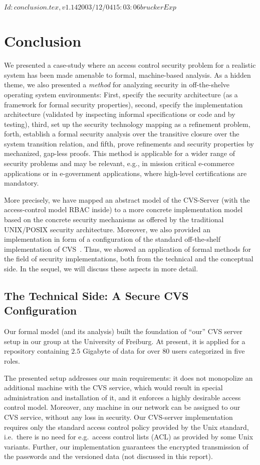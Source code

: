\rcsInfo $Id: conclusion.tex,v 1.14 2003/12/04 15:03:06 brucker Exp $

\chapter{Conclusion}

We presented a case-study where an access control security problem for a
realistic system has been made amenable to formal, machine-based analysis. As a
hidden theme, we also presented a \emph{method} for analyzing security in
off-the-shelve operating system environments: First, specify the security
architecture (as a framework for formal security properties), second, specify
the implementation architecture (validated by inspecting informal specifications
or code and by testing), third, set up the security technology mapping as a
refinement problem, forth, establish a formal security analysis over the
transitive closure over the system transition relation, and fifth, prove
refinements and security properties by mechanized, gap-less proofs. This method
is applicable for a wider range of security problems and may be relevant, e.g.,
in mission critical e-commerce applications or in e-government applications,
where high-level certifications are mandatory.

More precisely, we have mapped an abstract model of the CVS-Server (with the
access-control model RBAC inside) to a more concrete implementation model based
on the concrete security mechanisms as offered by the traditional UNIX/POSIX
security architecture. Moreover, we also provided an implementation in form of a
configuration of the standard off-the-shelf implementation of
CVS~\cite{cvshome:2001}.  Thus, we showed an application of formal methods for
the field of security implementations, both from the technical and the
conceptual side. In the sequel, we will discuss these aspects in more detail.

\section{The Technical Side: A Secure CVS Configuration}
Our formal model (and its analysis) built the foundation of ``our'' CVS server
setup in our group at the University of Freiburg. At present, it is applied for
a repository containing $2.5$ Gigabyte of data for over $80$ users categorized
in five roles.

The presented setup addresses our main requirements: it does not monopolize an
additional machine with the CVS service, which would result in special
administration and installation of it, and it enforces a highly desirable access
control model. Moreover, any machine in our network can be assigned to our CVS
service, without any loss in security. Our CVS-server implementation requires
only the standard access control policy provided by the Unix standard, i.e.\ there
is no need for e.g.\ access control lists (ACL) as provided by some Unix
variants. Further, our implementation guarantees the encrypted transmission of
the passwords and the versioned data (not discussed in this report).

